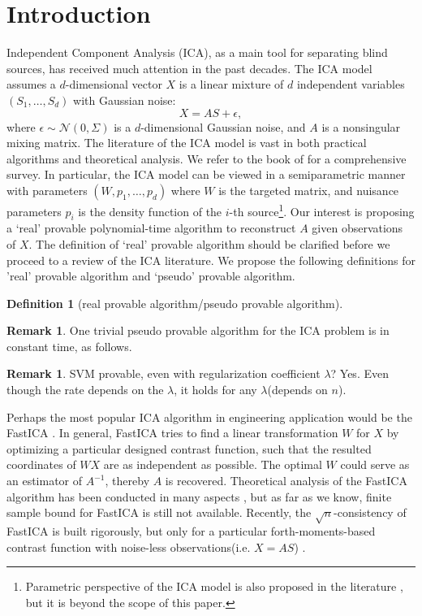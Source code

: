 \documentclass[twoside]{article}
\theoremstyle{definition}
\newtheorem{definition}[lemma]{Definition}
\newtheorem{remark}[lemma]{Remark}
\begin{document}
\section{Introduction}
\label{sec:Intro}
Independent Component Analysis (ICA), as a main tool for separating blind sources, has received much attention in the past decades. 
The ICA model assumes a $d$-dimensional vector $X$ is a linear mixture of $d$ independent variables $(S_1,\ldots, S_d)$ with Gaussian noise:
\[
X = AS+\epsilon,
\]
where $\epsilon \sim \mathcal{N}(0,\Sigma)$ is a $d$-dimensional Gaussian noise, and $A$ is a nonsingular mixing matrix.
The literature of the ICA model is vast in both practical algorithms and theoretical analysis. 
We refer to the book of \citet{comon2010handbook} for a comprehensive survey.
In particular, the ICA model can be viewed in a semiparametric manner with parameters $(W, p_1, \ldots, p_d)$ where $W$ is the targeted matrix, and nuisance parameters $p_i$ is the density function of the $i$-th source\footnote{Parametric perspective of the ICA model is also proposed in the literature \citep{pham1997blind,lee1999independent}, but it is beyond the scope of this paper.}. 
Our interest is proposing a `real' provable polynomial-time algorithm to reconstruct $A$ given observations of $X$.
The definition of `real' provable algorithm should be clarified before we proceed to a review of the ICA literature.
We propose the following definitions for 'real' provable algorithm and `pseudo' provable algorithm.
\begin{definition}[real provable algorithm/pseudo provable algorithm]
\end{definition}
\begin{remark}
One trivial pseudo provable algorithm for the ICA problem is in constant time, as follows.
\end{remark}
\begin{remark}
SVM provable, even with regularization coefficient $\lambda$?  Yes. Even though the rate depends on the $\lambda$, it holds for any $\lambda$(depends on $n$).
\end{remark}

Perhaps the most popular ICA algorithm in engineering application would be the FastICA \citep{hyvarinen1999fast}. 
In general, FastICA tries to find a linear transformation $W$ for $X$ by optimizing a particular designed contrast function, 
such that the resulted coordinates of $WX$ are as independent as possible. 
The optimal $W$ could serve as an estimator of $A^{-1}$, thereby $A$ is recovered.  
Theoretical analysis of the FastICA algorithm has been conducted in many aspects \citep{tichavsky2006performance,oja2006fastica,ollila2010deflation,dermoune2013fastica,wei2014convergence}, 
but as far as we know, finite sample bound for FastICA is still not available.
Recently, the $\sqrt{n}$-consistency of FastICA is built rigorously, but only for a particular forth-moments-based contrast function with noise-less observations(i.e. $X = AS$) \citep{miettinen2014fourth}. 
\end{document}
